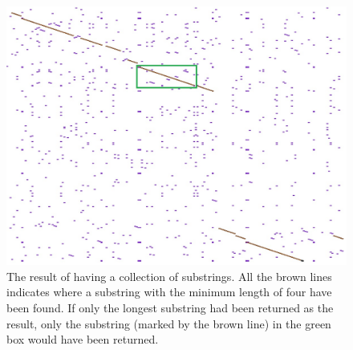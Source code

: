 \begin{figure}
	\centering
	\includegraphics[scale=0.35]{figures/SubstringCollection}
	\caption{The result of having a collection of substrings. All the brown lines indicates where a substring with the minimum length of four have been found. If only the longest substring had been returned as the result, only the substring (marked by the brown line) in the green box would have been returned.}
	\label{SubstringsEx}
\end{figure}





